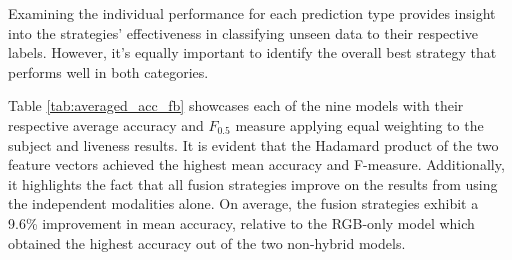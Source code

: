 \documentclass{mpaper}
\begin{document}
Examining the individual performance for each prediction type provides insight into the strategies' effectiveness in classifying unseen data to their respective labels. However, it's equally important to identify the overall best strategy that performs well in both categories.

Table \ref{tab:averaged_acc_fb} showcases each of the nine models with their respective average accuracy and $F_{0.5}$ measure applying equal weighting to the subject and liveness results. It is evident that the Hadamard product of the two feature vectors achieved the highest mean accuracy and F-measure. Additionally, it highlights the fact that all fusion strategies improve on the results from using the independent modalities alone. On average, the fusion strategies exhibit a 9.6\% improvement in mean accuracy, relative to the RGB-only model which obtained the highest accuracy out of the two non-hybrid models.

\begin{table}[htbp]
    \centering
    \vspace{-0.1cm}
    \vspace{0.1cm}
    \caption{Averaged accuracy and $F_{0.5}$ score for the seven fusion strategies and individual modalities, applying equal weighting to subject and liveness predictions.}
    \label{tab:averaged_acc_fb}
    \vspace{-0.9cm}
\end{table}
\end{document}
